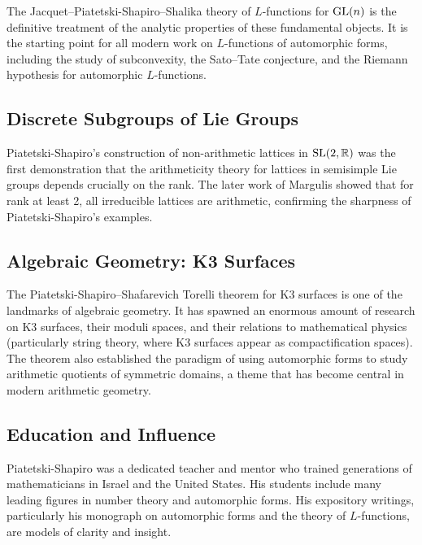 The Jacquet--Piatetski-Shapiro--Shalika theory of \(L\)-functions for \(\operatorname{GL}(n)\) is the definitive treatment of the analytic properties of these fundamental objects. It is the starting point for all modern work on \(L\)-functions of automorphic forms, including the study of subconvexity, the Sato--Tate conjecture, and the Riemann hypothesis for automorphic \(L\)-functions.

\subsection{Discrete Subgroups of Lie Groups}

Piatetski-Shapiro's construction of non-arithmetic lattices in \(\operatorname{SL}(2,\mathbb{R})\) was the first demonstration that the arithmeticity theory for lattices in semisimple Lie groups depends crucially on the rank. The later work of Margulis showed that for rank at least 2, all irreducible lattices are arithmetic, confirming the sharpness of Piatetski-Shapiro's examples.

\subsection{Algebraic Geometry: K3 Surfaces}

The Piatetski-Shapiro--Shafarevich Torelli theorem for K3 surfaces is one of the landmarks of algebraic geometry. It has spawned an enormous amount of research on K3 surfaces, their moduli spaces, and their relations to mathematical physics (particularly string theory, where K3 surfaces appear as compactification spaces). The theorem also established the paradigm of using automorphic forms to study arithmetic quotients of symmetric domains, a theme that has become central in modern arithmetic geometry.

\subsection{Education and Influence}

Piatetski-Shapiro was a dedicated teacher and mentor who trained generations of mathematicians in Israel and the United States. His students include many leading figures in number theory and automorphic forms. His expository writings, particularly his monograph on automorphic forms and the theory of \(L\)-functions, are models of clarity and insight.

